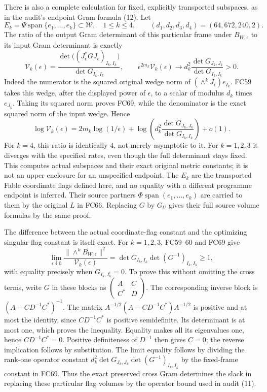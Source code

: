 \documentclass[11pt]{article}
\newcommand{\C}{\mathbb C}
\begin{document}
There is also a complete calculation for fixed, explicitly transported
subspaces, as in the audit's endpoint Gram formula (12). Let
\[
 E_k=\Psi\operatorname{span}\{e_1,\ldots,e_k\}\subset\mathcal W,
 \quad 1\le k\le4,
 \qquad (d_1,d_2,d_3,d_4)=(64,672,240,2).
\]
The ratio of the output Gram determinant of this particular frame under
$B_{W,\epsilon}$ to its input Gram determinant is exactly
\[
 \mathcal V_k(\epsilon)=
 \frac{\det\bigl((J_\epsilon^*GJ_\epsilon)_{I_k,I_k}\bigr)}
      {\det G_{I_k,I_k}},\qquad
 \epsilon^{2m_k}\mathcal V_k(\epsilon)
 \longrightarrow d_k^2\frac{\det G_{J_k,J_k}}{\det G_{I_k,I_k}}>0.
 \tag{FC69}
\]
Indeed the numerator is the squared original wedge norm of
$(\wedge^kJ_\epsilon)e_{I_k}$. FC59 takes this wedge, after
the displayed power of $\epsilon$, to a scalar of modulus $d_k$
times $e_{J_k}$. Taking its squared norm proves FC69, while the
denominator is the exact squared norm of the input wedge. Hence
\[
 \log\mathcal V_k(\epsilon)=2m_k\log(1/\epsilon)
   +\log\left(d_k^2\frac{\det G_{J_k,J_k}}
                                {\det G_{I_k,I_k}}\right)+o(1).
 \tag{FC70}
\]
For $k=4$, this ratio is identically $4$, not merely asymptotic to it.
For $k=1,2,3$ it diverges with the specified rates, even though the
full determinant stays fixed. This computes actual subspaces and their
exact original metric constants; it is not an upper enclosure for an
unspecified endpoint. The $E_k$ are the transported Fable coordinate
flags defined here, and no equality with a different programme endpoint
is inferred. Their source partners $\Phi\operatorname{span}(e_1,\ldots,e_k)$
are carried to them by the original $L$ in FC66. Replacing $G$ by
$G_U$ gives their full source volume formulas by the same proof.

The difference between the actual coordinate-flag constant and the
optimizing singular-flag constant is itself exact. For $k=1,2,3$,
FC59--60 and FC69 give
\[
 \lim_{\epsilon\downarrow0}
 \frac{\|\wedge^k B_{W,\epsilon}\|^2}{\mathcal V_k(\epsilon)}
 =\det G_{I_k,I_k}\det(G^{-1})_{I_k,I_k}\ge1,
 \tag{FC71}
\]
with equality precisely when $G_{I_k,I_k^c}=0$. To prove this
without omitting the cross terms, write $G$ in these blocks as
$\left(\begin{smallmatrix}A&C\\C^*&D\end{smallmatrix}\right)$.
The corresponding inverse block is $(A-CD^{-1}C^*)^{-1}$.
The matrix $A^{-1/2}(A-CD^{-1}C^*)A^{-1/2}$ is positive and at
most the identity, since $CD^{-1}C^*$ is positive semidefinite.
Its determinant is at most one, which proves the inequality.
Equality makes all its eigenvalues one, hence $CD^{-1}C^*=0$.
Positive definiteness of $D^{-1}$ then gives $C=0$; the reverse
implication follows by substitution. The limit equality follows
by dividing the rank-one operator constant
$d_k^2\det G_{J_k,J_k}\det(G^{-1})_{I_k,I_k}$ by the fixed-frame
constant in FC69. Thus the exact preserved cross Gram determines
the slack in replacing these particular flag volumes by the operator
bound used in audit (11).
\end{document}
